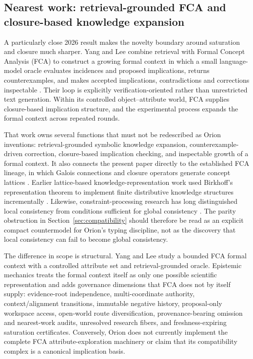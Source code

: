 \subsection{Nearest work: retrieval-grounded FCA and closure-based knowledge expansion}

A particularly close 2026 result makes the novelty boundary around saturation and closure much sharper. Yang and Lee combine retrieval with Formal Concept Analysis (FCA) to construct a growing formal context in which a small language-model oracle evaluates incidences and proposed implications, returns counterexamples, and makes accepted implications, contradictions and corrections inspectable \cite{yanglee2026fca}. Their loop is explicitly verification-oriented rather than unrestricted text generation. Within its controlled object--attribute world, FCA supplies closure-based implication structure, and the experimental process expands the formal context across repeated rounds.

That work owns several functions that must not be redescribed as Orion inventions: retrieval-grounded symbolic knowledge expansion, counterexample-driven correction, closure-based implication checking, and inspectable growth of a formal context. It also connects the present paper directly to the established FCA lineage, in which Galois connections and closure operators generate concept lattices \cite{ganter1999}. Earlier lattice-based knowledge-representation work used Birkhoff's representation theorem to implement finite distributive knowledge structures incrementally \cite{oles2000}. Likewise, constraint-processing research has long distinguished local consistency from conditions sufficient for global consistency \cite{dechter1992}. The parity obstruction in Section~\ref{sec:compatibility} should therefore be read as an explicit compact countermodel for Orion's typing discipline, not as the discovery that local consistency can fail to become global consistency.

The difference in scope is structural. Yang and Lee study a bounded FCA formal context with a controlled attribute set and retrieval-grounded oracle. Epistemic mechanics treats the formal context itself as only one possible scientific representation and adds governance dimensions that FCA does not by itself supply: evidence-root independence, multi-coordinate authority, context/alignment transitions, immutable negative history, proposal-only workspace access, open-world route diversification, provenance-bearing omission and nearest-work audits, unresolved research fibers, and freshness-expiring saturation certificates. Conversely, Orion does not currently implement the complete FCA attribute-exploration machinery or claim that its compatibility complex is a canonical implication basis.

